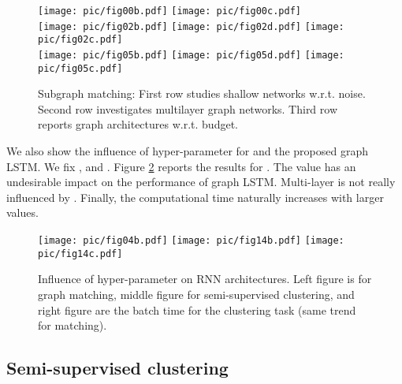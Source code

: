 \documentclass{article} \usepackage{iclr2018_conference,times}
\begin{document}
\begin{figure}[h!]
\centering
\hspace{-0.53cm}
\texttt{[image: pic/fig00b.pdf]}
\hspace{-0.53cm}
\texttt{[image: pic/fig00c.pdf]}\\
\texttt{[image: pic/fig02b.pdf]}
\hspace{-0.53cm}
\texttt{[image: pic/fig02d.pdf]}
\hspace{-0.53cm}
\texttt{[image: pic/fig02c.pdf]}\\
\texttt{[image: pic/fig05b.pdf]}
\hspace{-0.53cm}
\texttt{[image: pic/fig05d.pdf]}
\hspace{-0.53cm}
\texttt{[image: pic/fig05c.pdf]}
\caption{Subgraph matching: First row studies shallow networks w.r.t. noise. Second row investigates multilayer graph networks. Third row reports graph architectures w.r.t. budget.}
\label{fig_matching}
\end{figure}








We also show the influence of hyper-parameter  for \cite{art:LiTarlowBrockschmidtZemel16GNN} and the proposed graph LSTM. We fix ,  and . Figure \ref{fig1e} reports the results for . The  value has an undesirable impact on the performance of graph LSTM. Multi-layer \cite{art:LiTarlowBrockschmidtZemel16GNN} is not really influenced by . Finally, the computational time naturally increases with larger  values. 
\begin{figure}[h!]
\centering
\texttt{[image: pic/fig04b.pdf]}
\hspace{-0.53cm}
\texttt{[image: pic/fig14b.pdf]}
\hspace{-0.53cm}
\texttt{[image: pic/fig14c.pdf]}
\caption{Influence of  hyper-parameter  on RNN architectures. Left figure is for graph matching, middle figure for semi-supervised clustering, and right figure are the batch time for the clustering task (same trend for matching).}
\label{fig1e}
\end{figure}








\subsection{Semi-supervised clustering}
\end{document}
